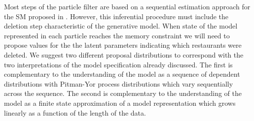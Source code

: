 



Most steps of the particle filter are based on a sequential estimation approach for the SM proposed in \cite{Gasthaus2010}.  However, this inferential procedure must include the deletion step characteristic of the generative model.  When state of the model represented in each particle reaches the memory constraint we will need to propose values for the the latent parameters indicating which restaurants were deleted. We suggest two different proposal distributions to correspond with the two interpretations of the model specification already discussed.  The first is complementary to the understanding of the model as a sequence of dependent distributions with Pitman-Yor process distributions which vary sequentially across the sequence.  The second is complementary to the understanding of the model as a finite state approximation of a model representation which grows linearly as a function of the length of the data.

